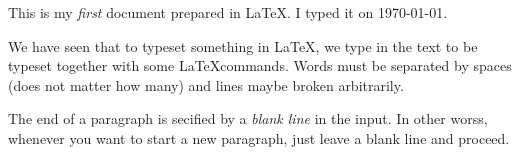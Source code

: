 \documentclass{article}
\begin{document}
This is my \emph{first} document prepared in \LaTeX. I typed it on \today.

We have seen that to typeset something in \LaTeX, we type in the
text to be typeset together with some \LaTeX commands.
Words must be separated by spaces (does not matter how many)
and lines maybe broken arbitrarily.

The end of a paragraph is secified by a \emph{blank line}
in the input. In other worss, whenever you want to start a new
paragraph, just leave a blank line and proceed.
\end{document}
